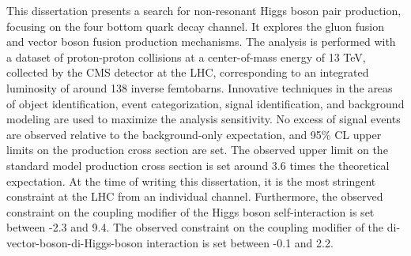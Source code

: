 This dissertation presents a search for non-resonant Higgs boson pair production, focusing on the four bottom quark decay channel. It explores the gluon fusion and vector boson fusion production mechanisms. The analysis is performed with a dataset of proton-proton collisions at a center-of-mass energy of 13 TeV, collected by the CMS detector at the LHC, corresponding to an integrated luminosity of around 138 inverse femtobarns. Innovative techniques in the areas of object identification, event categorization, signal identification, and background modeling are used to maximize the analysis sensitivity. No excess of signal events are observed relative to the background-only expectation, and 95\% CL upper limits on the production cross section are set. The observed upper limit on the standard model production cross section is set around 3.6 times the theoretical expectation. At the time of writing this dissertation, it is the most stringent constraint at the LHC from an individual channel. Furthermore, the observed constraint on the coupling modifier of the Higgs boson self-interaction is set between -2.3 and 9.4. The observed constraint on the coupling modifier of the di-vector-boson-di-Higgs-boson interaction is set between -0.1 and 2.2.
 
